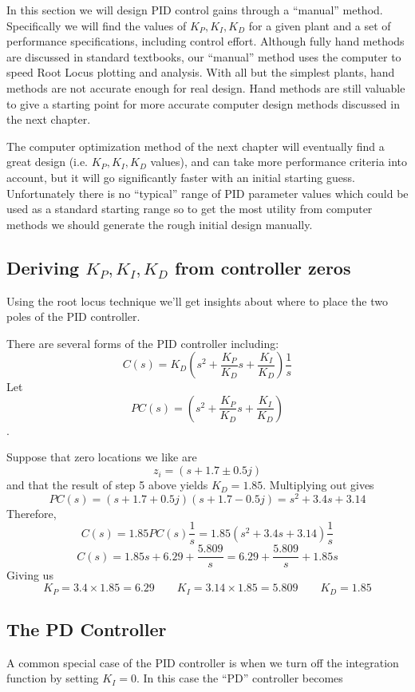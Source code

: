 In this section we will design PID control gains through a ``manual'' method.  Specifically we will find the values of $K_P, K_I, K_D$ for a given plant and a set of performance specifications, including control effort.  Although fully hand methods are discussed in standard textbooks, our ``manual'' method uses the computer to speed Root Locus plotting and analysis.   With all but the simplest plants, hand methods are not accurate enough for real design.  Hand methods are still valuable to give a starting point for more accurate computer design methods discussed in the next chapter.

The computer optimization method of the next chapter will eventually find a great design (i.e. $K_P,K_I,K_D$ values), and can take more performance criteria into account, but it will go significantly faster with an initial starting guess.   Unfortunately there is no ``typical'' range of PID parameter values which could be used as a standard starting range so to get the most utility from computer methods we should generate the rough initial design manually.


\subsection{Deriving $K_P, K_I, K_D$ from controller zeros}\label{Kpderive}

Using the root locus technique we'll get insights about where to place
the two poles of the PID controller.

There are several forms of the PID controller including:
\[
C(s) = K_D \left ( s^2+ \frac{K_P}{K_D}s + \frac{K_I}{K_D} \right ) \frac{1}{s}
\]
Let
\[
PC(s) = \left ( s^2+ \frac{K_P}{K_D}s + \frac{K_I}{K_D} \right )
\].

Suppose that zero locations we like are
\[
z_i = (s + 1.7 \pm 0.5j)
\]
and that the result of step 5 above yields $K_D = 1.85$.   Multiplying out gives
\[
PC(s) = (s + 1.7 + 0.5j)(s + 1.7 - 0.5j)  = s^2 + 3.4s + 3.14
\]
Therefore,
\[
C(s) = 1.85 PC(s) \frac{1}{s} = 1.85(s^2 + 3.4s + 3.14)\frac{1}{s}
\]
\[
C(s) = 1.85s + 6.29 + \frac {5.809} {s} = 6.29 + \frac {5.809} {s} + 1.85s
\]
Giving us
\[
K_P = 3.4\times 1.85 = 6.29   \qquad  K_I = 3.14\times1.85 = 5.809 \qquad K_D = 1.85
\]

\subsection{The PD Controller}
A common special case of the PID controller is when we turn off the
integration function by setting $K_I=0$.
In this case the ``PD''  controller becomes

